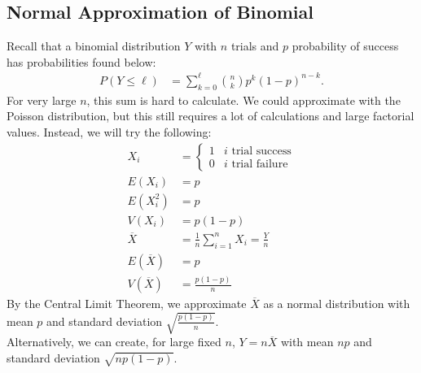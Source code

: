 \documentclass[10pt]{extarticle}
\begin{document}
  \subsection{Normal Approximation of Binomial}%
  Recall that a binomial distribution $Y$ with $n$ trials and $p$ probability of success has probabilities found below:
  \begin{align*}
    P(Y\leq \ell) &= \sum_{k=0}^{\ell} {n\choose k}p^k (1-p)^{n-k}.
  \end{align*}
  For very large $n$, this sum is hard to calculate. We could approximate with the Poisson distribution, but this still requires a lot of calculations and large factorial values. Instead, we will try the following:
    \begin{align*}
      X_i &= \begin{cases}
        1 & \text{$i$ trial success}\\
        0 & \text{$i$ trial failure}
      \end{cases}\\
        E(X_i) &= p\\
        E(X_i^2) &= p\\
        V(X_i) &= p(1-p)\\
        \overline{X} &= \frac{1}{n}\sum_{i=1}^{n}X_i = \frac{Y}{n}\\
        E(\overline{X}) &= p\\
        V(\overline{X}) &= \frac{p(1-p)}{n}
    \end{align*}
    By the Central Limit Theorem, we approximate $\overline{X}$ as a normal distribution with mean $p$ and standard deviation $\sqrt{\frac{p(1-p)}{n}}$.\\

    Alternatively, we can create, for large fixed $n$, $Y = n\overline{X}$ with mean $np$ and standard deviation $\sqrt{np(1-p)}$.\\
\end{document}

